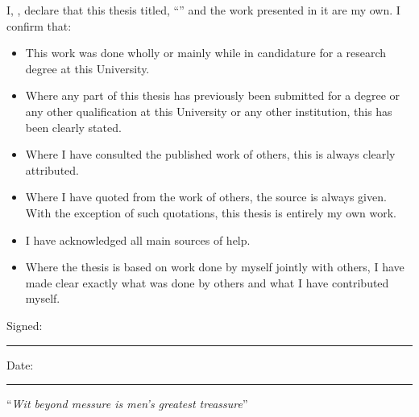 \documentclass[
12pt, %
oneside, %
english, %
doublespacing, %
nolistspacing, %
headsepline, %
chapterinoneline, %
]{MastersDoctoralThesis} %
\begin{document}

\begin{declaration}
\addchaptertocentry{\authorshipname} %
\noindent I, \authorname, declare that this thesis titled, \enquote{\ttitle} and the work presented in it are my own. I confirm that:

\begin{itemize} 
\item This work was done wholly or mainly while in candidature for a research degree at this University.
\item Where any part of this thesis has previously been submitted for a degree or any other qualification at this University or any other institution, this has been clearly stated.
\item Where I have consulted the published work of others, this is always clearly attributed.
\item Where I have quoted from the work of others, the source is always given. With the exception of such quotations, this thesis is entirely my own work.
\item I have acknowledged all main sources of help.
\item Where the thesis is based on work done by myself jointly with others, I have made clear exactly what was done by others and what I have contributed myself.\\
\end{itemize}
 
\noindent Signed:\\
\rule[0.5em]{25em}{0.5pt} %
 
\noindent Date:\\
\rule[0.5em]{25em}{0.5pt} %
\end{declaration}

\cleardoublepage


\vspace*{0.2\textheight}

\noindent\enquote{\itshape Wit beyond messure is men's greatest treassure}\bigbreak
\end{document}
